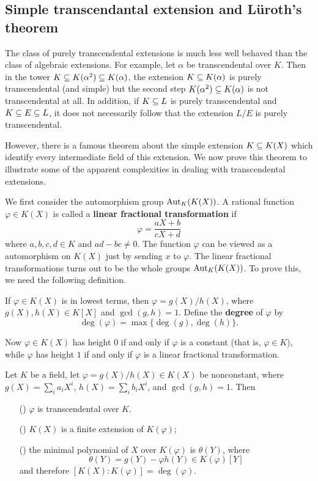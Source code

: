 \subsection{Simple transcendantal extension and L\"uroth's theorem}
The class of purely transcendental extensions is much less well behaved than the class of algebraic extensions. For example, let $\alpha$ be transcendental over $K$. Then in the tower $K\subseteq K(\alpha^2)\subseteq K(\alpha)$, the extension $K\subseteq K(\alpha)$ is purely transcendental (and simple) but the second step $K(\alpha^2)\subseteq K(\alpha)$ is not transcendental at all. In addition, if $K\subseteq L$ is purely transcendental and $K\subseteq E\subseteq L$, it does not necessarily follow that the extension $L/E$ is purely transcendental.\par
However, there is a famous theorem about the simple extension $K\subseteq K(X)$ which identify every intermediate field of this extension. We now prove this theorem to illustrate some of the apparent complexities in dealing with transcendental extensions.\par
We first consider the automorphism group $\mathrm{Aut}_K(K(X))$. A rational function $\varphi\in K(X)$ is called a \textbf{linear fractional transformation} if
\[\varphi=\frac{aX+b}{cX+d}\]
where $a,b,c,d\in K$ and $ad-bc\neq 0$. The function $\varphi$ can be viewed as a automorphism on $K(X)$ just by sending $x$ to $\varphi$. The linear fractional transformations turns out to be the whole groups $\mathrm{Aut}_K(K(X))$. To prove this, we need the following definition.
\begin{definition}
If $\varphi\in K(X)$ is in lowest terms, then $\varphi=g(X)/h(X)$, where $g(X),h(X)\in K[X]$ and $\gcd(g,h)=1$. Define the \textbf{degree} of $\varphi$ by
\[\deg(\varphi)=\max\{\deg(g),\deg(h)\}.\]
\end{definition}
Now $\varphi\in K(X)$ has height $0$ if and only if $\varphi$ is a constant (that is, $\varphi\in K$), while $\varphi$ has height $1$ if and only if $\varphi$ is a linear fractional transformation.
\begin{proposition}\label{field simple transcendental ext minimal poly of elements}
Let $K$ be a field, let $\varphi=g(X)/h(X)\in K(X)$ be nonconstant, where $g(X)=\sum_ia_iX^i$, $h(X)=\sum_ib_iX^i$, and $\gcd(g,h)=1$. Then
\begin{itemize}
\item[(\rmnum{1})] $\varphi$ is transcendental over $K$.
\item[(\rmnum{2})] $K(X)$ is a finite extension of $K(\varphi)$;
\item[(\rmnum{3})] the minimal polynomial of $X$ over $K(\varphi)$ is $\theta(Y)$, where
\[\theta(Y)=g(Y)-\varphi h(Y)\in K(\varphi)[Y]\]
and therefore $[K(X):K(\varphi)]=\deg(\varphi)$.
\end{itemize}
\end{proposition}

